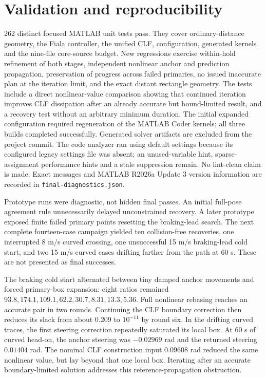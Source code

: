 \documentclass[11pt]{article}
\begin{document}
\section{Validation and reproducibility}
262 distinct focused MATLAB unit tests pass. They cover ordinary-distance
geometry, the Fiala controller, the unified CLF, configuration, generated
kernels and the nine-file core-source budget. New regressions exercise
within-hold refinement of both stages, independent nonlinear anchor and
prediction propagation, preservation of progress across failed primaries,
no issued inaccurate plan at the iteration limit, and the exact distant
rectangle geometry. The tests include a direct nonlinear-value comparison showing that continued
iteration improves CLF dissipation after an already accurate but bound-limited
result, and a recovery test without an arbitrary minimum duration. The initial
expanded configuration required regeneration
of the MATLAB Coder kernels; all three builds completed successfully.
Generated solver artifacts are excluded from the project commit.
The code analyzer ran using default settings because its configured legacy
settings file was absent; an unused-variable hint, sparse-assignment
performance hints and a stale suppression remain. No lint-clean claim is made.
Exact messages and MATLAB R2026a Update 3 version information are recorded in
\texttt{final-diagnostics.json}.

Prototype runs were diagnostic, not hidden final passes. An initial full-pose
agreement rule unnecessarily delayed unconstrained recovery. A later prototype
exposed finite failed primary points resetting the braking-lead search.
The next complete fourteen-case campaign yielded ten collision-free recoveries,
one interrupted 8 m/s curved crossing, one unsuccessful 15 m/s braking-lead
cold start, and two 15 m/s curved cases drifting farther from the path at
60 s. These are not presented as final successes.

The braking cold start alternated between tiny damped anchor movements and
forced primary-box expansion: eight ratios remained
$93.8,174.1,109.1,62.2,30.7,8.31,13.3,5.36$. Full nonlinear rebasing reaches
an accurate pair in two rounds. Continuing the CLF boundary correction then
reduces its slack from about 0.209 to $10^{-11}$ by round six. In the drifting
curved traces, the first steering correction repeatedly saturated its local
box. At 60 s of curved head-on, the anchor steering was $-0.02969$ rad and
the returned steering $0.01404$ rad. The nominal CLF construction input
$0.09608$ rad reduced the same nonlinear value, but lay beyond that one local
box. Iterating after an accurate boundary-limited solution addresses this
reference-propagation obstruction.
\end{document}
